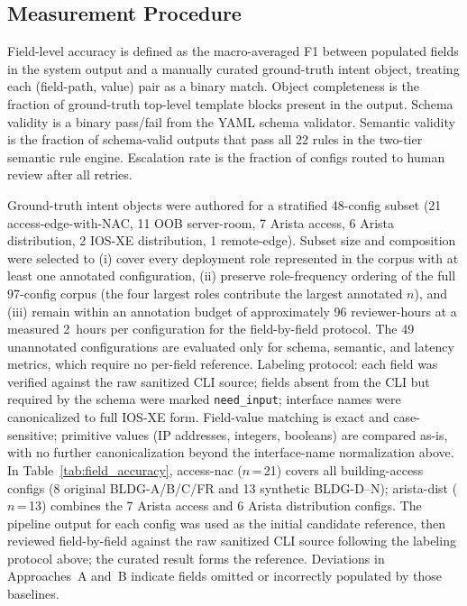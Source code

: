 \documentclass[conference]{IEEEtran}
\begin{document}
\subsection{Measurement Procedure}
\label{sec:measurement}

Field-level accuracy is defined as the macro-averaged F1 between populated fields in the system output and a manually curated ground-truth intent object, treating each (field-path, value) pair as a binary match. Object completeness is the fraction of ground-truth top-level template blocks present in the output. Schema validity is a binary pass/fail from the YAML schema validator. Semantic validity is the fraction of schema-valid outputs that pass all 22 rules in the two-tier semantic rule engine. Escalation rate is the fraction of configs routed to human review after all retries.

Ground-truth intent objects were authored for a stratified 48-config subset (21 access-edge-with-NAC, 11 OOB server-room, 7 Arista access, 6 Arista distribution, 2 IOS-XE distribution, 1 remote-edge). Subset size and composition were selected to (i) cover every deployment role represented in the corpus with at least one annotated configuration, (ii) preserve role-frequency ordering of the full 97-config corpus (the four largest roles contribute the largest annotated $n$), and (iii) remain within an annotation budget of approximately 96 reviewer-hours at a measured 2~hours per configuration for the field-by-field protocol. The 49 unannotated configurations are evaluated only for schema, semantic, and latency metrics, which require no per-field reference. Labeling protocol: each field was verified against the raw sanitized CLI source; fields absent from the CLI but required by the schema were marked \texttt{need\_input}; interface names were canonicalized to full IOS-XE form. Field-value matching is exact and case-sensitive; primitive values (IP addresses, integers, booleans) are compared as-is, with no further canonicalization beyond the interface-name normalization above. In Table~\ref{tab:field_accuracy}, access-nac ($n$\,=\,21) covers all building-access configs (8 original BLDG-A/B/C/FR and 13 synthetic BLDG-D--N); arista-dist ($n$\,=\,13) combines the 7 Arista access and 6 Arista distribution configs. The pipeline output for each config was used as the initial candidate reference, then reviewed field-by-field against the raw sanitized CLI source following the labeling protocol above; the curated result forms the reference. Deviations in Approaches~A and~B indicate fields omitted or incorrectly populated by those baselines.
\end{document}
